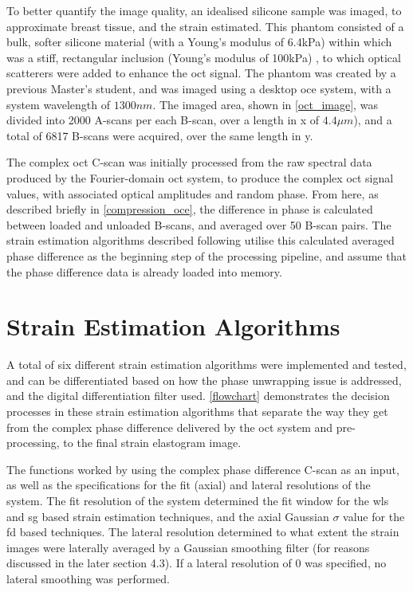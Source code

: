 To better quantify the image quality, an idealised silicone sample was imaged, to approximate breast tissue, and the strain estimated. This phantom consisted of a bulk, softer silicone material (with a Young's modulus of 6.4kPa) within which was a stiff, rectangular inclusion (Young's modulus of 100kPa) \cite{hepburn_improving_2017}, to which optical scatterers were added to enhance the \ac{oct} signal. The phantom was created by a previous Master's student, and was imaged using a desktop \ac{oce} system, with a system wavelength of $1300nm$. The imaged area, shown in \autoref{oct_image}, was divided into 2000 A-scans per each B-scan, over a length in x of $4.4\mu m$), and a total of 6817 B-scans were acquired, over the same length in y.

The complex \ac{oct} C-scan was initially processed from the raw spectral data produced by the Fourier-domain \ac{oct} system, to produce the complex \ac{oct} signal values, with associated optical amplitudes and random phase. From here, as described briefly in \autoref{compression_oce}, the difference in phase is calculated between loaded and unloaded B-scans, and averaged over 50 B-scan pairs. The strain estimation algorithms described following utilise this calculated averaged phase difference as the beginning step of the processing pipeline, and assume that the phase difference data is already loaded into memory.

\section{Strain Estimation Algorithms}\label{algorithms}

A total of six different strain estimation algorithms were implemented and tested, and can be differentiated based on how the phase unwrapping issue is addressed, and the digital differentiation filter used. \autoref{flowchart} demonstrates the decision processes in these strain estimation algorithms that separate the way they get from the complex phase difference delivered by the \ac{oct} system and pre-processing, to the final strain elastogram image.

The functions worked by using the complex phase difference C-scan as an input, as well as the specifications for the fit (axial) and lateral resolutions of the system. The fit resolution of the system determined the fit window for the \ac{wls} and \ac{sg} based strain estimation techniques, and the axial Gaussian $\sigma$ value for the \ac{fd} based techniques. The lateral resolution determined to what extent the strain images were laterally averaged by a Gaussian smoothing filter (for reasons discussed in the later section 4.3). If a lateral resolution of 0 was specified, no lateral smoothing was performed. 

